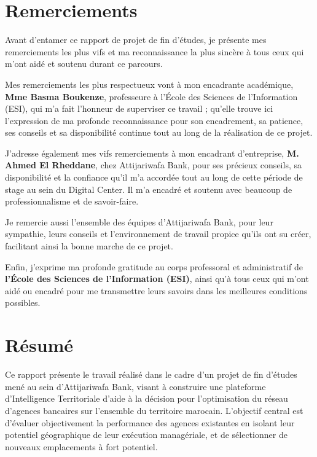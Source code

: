 \documentclass[11pt,a4paper,twoside]{report}
\begin{document}
\chapter*{Remerciements}

\vspace{1cm}

Avant d'entamer ce rapport de projet de fin d'études, je présente mes remerciements les plus vifs et ma reconnaissance la plus sincère à tous ceux qui m'ont aidé et soutenu durant ce parcours.

Mes remerciements les plus respectueux vont à mon encadrante académique, \textbf{Mme Basma Boukenze}, professeure à l'École des Sciences de l'Information (ESI), qui m'a fait l'honneur de superviser ce travail ; qu'elle trouve ici l'expression de ma profonde reconnaissance pour son encadrement, sa patience, ses conseils et sa disponibilité continue tout au long de la réalisation de ce projet.

J'adresse également mes vifs remerciements à mon encadrant d'entreprise, \textbf{M. Ahmed El Rheddane}, chez Attijariwafa Bank, pour ses précieux conseils, sa disponibilité et la confiance qu'il m'a accordée tout au long de cette période de stage au sein du Digital Center. Il m'a encadré et soutenu avec beaucoup de professionnalisme et de savoir-faire.

Je remercie aussi l'ensemble des équipes d'Attijariwafa Bank, pour leur sympathie, leurs conseils et l'environnement de travail propice qu'ils ont su créer, facilitant ainsi la bonne marche de ce projet.

Enfin, j'exprime ma profonde gratitude au corps professoral et administratif de \textbf{l'École des Sciences de l'Information (ESI)}, ainsi qu'à tous ceux qui m'ont aidé ou encadré pour me transmettre leurs savoirs dans les meilleures conditions possibles.

\newpage


\chapter*{Résumé}

\vspace{1cm}

Ce rapport présente le travail réalisé dans le cadre d'un projet de fin d'études mené au sein d'Attijariwafa Bank, visant à construire une plateforme d'Intelligence Territoriale d'aide à la décision pour l'optimisation du réseau d'agences bancaires sur l'ensemble du territoire marocain. L'objectif central est d'évaluer objectivement la performance des agences existantes en isolant leur potentiel géographique de leur exécution managériale, et de sélectionner de nouveaux emplacements à fort potentiel.
\end{document}
